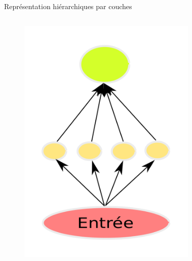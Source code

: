 \documentclass{beamer}
\begin{document}
\begin{frame}{Représentation hiérarchiques par couches}

  \begin{columns}
    {
      \begin{figure}
        \centering
        \includegraphics[scale=0.1750]{../Figures/Shallow}
      \end{figure}
    }
    {
      \begin{figure}
        \centering

\end{figure}}
\end{columns}
\end{frame}
\end{document}
